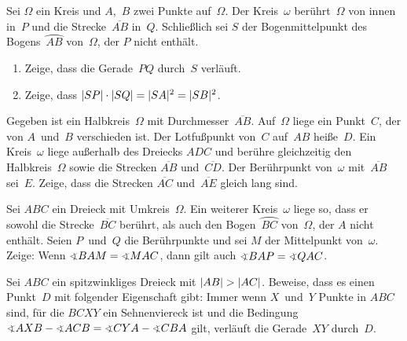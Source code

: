 
\begin{aufgabe*}
	Sei $\Omega$ ein Kreis und $A$,~$B$ zwei Punkte auf~$\Omega$. Der Kreis~$\omega$ berührt~$\Omega$ von innen in~$P$ und die Strecke~$\overline{AB}$ in~$Q$. 
	Schließlich sei $S$ der Bogenmittelpunkt des Bogens~$\wideparen{AB}$ von~$\Omega$, der $P$ nicht enthält.
	\begin{enumerate}%
		\item Zeige, dass die Gerade~$PQ$ durch~$S$ verläuft.
		\item Zeige, dass $\lvert SP\rvert\cdot \lvert SQ\rvert=\lvert SA\rvert^2=\lvert SB\rvert^2$.
	\end{enumerate}
\end{aufgabe*}

\begin{aufgabe*}
	Gegeben ist ein Halbkreis~$\Omega$ mit Durchmesser~$\overline{AB}$. Auf~$\Omega$ liege ein Punkt~$C$, der von $A$~und~$B$ verschieden ist. Der Lotfußpunkt von~$C$ auf~$AB$ heiße~$D$. Ein Kreis~$\omega$ liege außerhalb des Dreiecks $ADC$ und berühre gleichzeitig den Halbkreis~$\Omega$ sowie die Strecken $\overline{AB}$ und~$\overline{CD}$. Der Berührpunkt von~$\omega$ mit~$\overline{AB}$ sei~$E$. Zeige, dass die Strecken $\overline{AC}$ und~$\overline{AE}$ gleich lang sind. 
\end{aufgabe*}

\begin{aufgabe*}
	Sei $ABC$ ein Dreieck mit Umkreis~$\Omega$. Ein weiterer Kreis~$\omega$ liege so, dass er sowohl die Strecke~$\overline{BC}$ berührt, 
	als auch den Bogen~$\wideparen{BC}$ von~$\Omega$, der $A$ nicht enthält. Seien $P$~und~$Q$ die Berührpunkte und sei $M$ der Mittelpunkt von~$\omega$. Zeige: Wenn $\winkel BAM=\winkel MAC$, dann gilt auch $\winkel BAP=\winkel QAC$.
\end{aufgabe*}

\begin{aufgabe*}
	Sei $ABC$ ein spitzwinkliges Dreieck mit $\lvert AB\rvert>\lvert AC\rvert$. Beweise, dass es einen Punkt~$D$ mit folgender Eigenschaft gibt: Immer wenn $X$~und~$Y$ Punkte in $ABC$ sind, für die $BCXY$ ein Sehnenviereck ist und die Bedingung $\winkel AXB-\winkel ACB=\winkel CYA-\winkel CBA$ gilt, verläuft die Gerade~$XY$ durch~$D$.
\end{aufgabe*}

